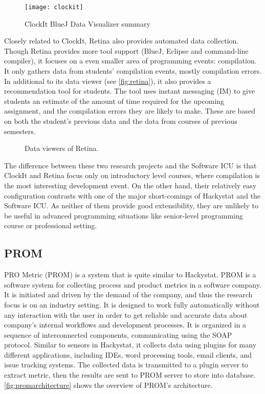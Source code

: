 \begin{figure}[htbp] %
   \centering
   \texttt{[image: clockit]} 
   \caption{ClockIt BlueJ Data Visualizer summary}
   \label{fig:clockit}
\end{figure}

Closely related to ClockIt, Retina also provides automated data collection. Though Retina provides more tool support (BlueJ, Eclipse and command-line compiler), it focuses on a even smaller area of programming events: compilation. It only gathers data from students' compilation events, mostly compilation errors. In additional to its data viewer (see \autoref{fig:retina}), it also provides a recommendation tool for students. The tool uses instant messaging (IM) to give students an estimate of the amount of time required for the upcoming assignment, and the compilation errors they are likely to make. These are based on both the student's previous data and the data from courses of previous semesters. 

\begin{figure}[htbp]
     \centering
          
     \caption{Data viewers of Retina.}
     \label{fig:retina}
\end{figure}

The difference between these two research projects and the Software ICU is that ClockIt and Retina focus only on introductory level courses, where compilation is the most interesting development event. On the other hand, their relatively easy configuration contrasts with one of the major short-comings of Hackystat and the Software ICU. As neither of them provide good extensibility, they are unlikely to be useful in advanced programming situations like senior-level programming course or professional setting.

\subsection {PROM}
PRO Metric (PROM) \cite{prom03} is a system that is quite similar to Hackystat. PROM is a software system for collecting process and product metrics in a software company. It is initiated and driven by the demand of the company, and thus the research focus is on an industry setting. It is designed to work fully automatically without any interaction with the user in order to get reliable and accurate data about company's internal workflows and development processes. It is organized in a sequence of interconnected components, communicating using the SOAP protocol. Similar to sensors in Hackystat, it collects data using plugins for many different applications, including IDEs, word processing tools, email clients, and issue tracking systems. The collected data is transmitted to a plugin server to extract metric, then the results are sent to PROM server to store into database. \autoref{fig:promarchitecture} shows the overview of PROM's architecture.

